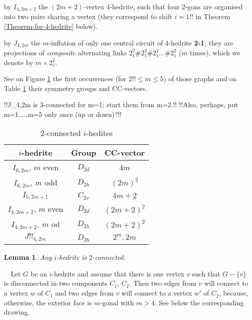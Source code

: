 \documentclass[12pt]{article}
\newtheorem{lemma}{Lemma}
\newcommand{\proof}{\noindent{\bf Proof.}\ \ }
\begin{document}
by $I_{4,2m+2}$ the $(2m+2)$-vertex $4$-hedrite, such that 
four $2$-gons are organised into two pairs sharing a vertex (they correspond to shift $i=1$!! in Theorem \ref{Theorem-for-4-hedrite} below).

by $J_{4,2m}$ the $m$-inflation of only one central circuit of
$4$-hedrite {\bf 2-1}; they are projections of {\em composite}
alternating links $2^2_1\#2^2_1\#2^2_1\dots\#2^2_1$ ($m$ times),
which we denote by $m\times 2^2_1$.

See on Figure \ref{fig:FamilyIin} the first occurrences
(for $2!!\leq m\leq 5$) of those graphs and on Table \ref{FundamentalInfo}
their symmetry groups and CC-vectors.

\begin{figure}
\centering
\epsfxsize=100mm
\label{fig:FamilyIin}
\end{figure}
!!J_4,2m is 3-connected for m=1; start them from m=2.!!
!!Also, perhaps, put m=1,...,m=5 only once (up or down)?!!


\begin{table}
\begin{center}
\begin{tabular}{||c|c|c||}
\hline\hline
$i$-hedrite            &Group      &CC-vector\\\hline\hline
$I_{6,2m}$, $m$ even   &$D_{2d}$   &$4m$\\\hline
$I_{6,2m}$, $m$ odd    &$D_{2h}$   &$(2m)^2$\\\hline
$I_{5,2m+1}$           &$C_{2v}$   &$4m+2$\\\hline
$I_{4,2m+2}$, $m$ even &$D_{2d}$   &$(2m+2)^2$\\\hline
$I_{4,2m+2}$, $m$ od   &$D_{2h}$   &$(2m+2)^2$\\\hline
$J!!_{4,2m}$              &$D_{2h}$   &$2^m, 2m$\\\hline\hline
\end{tabular}
\end{center}
\caption{$2$-connected $i$-hedites}
\label{FundamentalInfo}
\end{table}



\begin{lemma}
Any $i$-hedrite is $2$-connected.
\end{lemma}
\proof Let $G$ be an $i$-hedrite and assume that there is one vertex $v$ such that $G-\{v\}$ is disconnected in two components $C_1$, $C_2$. Then two edges from $v$ will connect to a vertex $w$ of $C_1$ and two edges from $v$ will connect to a vertex $w'$ of $C_2$, because, otherwise, the exterior face is $m$-gonal with $m>4$. See below the corresponding drawing.
\end{document}
